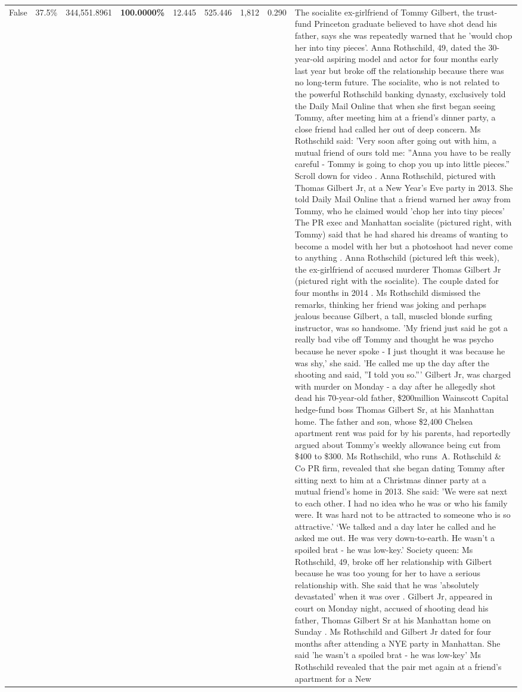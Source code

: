 \begin{table}[H]
\begin{tabular}{lllrlllll}
False & 37.5\% & 344,551.8961 & \bfseries \color{red} 100.0000\% & 12.445 & 525.446 & 1,812 & 0.290 & The socialite ex-girlfriend of Tommy Gilbert, the trust-fund Princeton graduate believed to have shot dead his father, says she was repeatedly warned that he 'would chop her into tiny pieces'. Anna Rothschild, 49, dated the 30-year-old aspiring model and actor for four months early last year but broke off the relationship because there was no long-term future. The socialite, who is not related to the powerful Rothschild banking dynasty, exclusively told the Daily Mail Online that when she first began seeing Tommy, after meeting him at a friend's dinner party, a close friend had called her out of deep concern. Ms Rothschild said: 'Very soon after going out with him, a mutual friend of ours told me: ''Anna you have to be really careful - Tommy is going to chop you up into little pieces.'' Scroll down for video . Anna Rothschild, pictured with Thomas Gilbert Jr, at a New Year's Eve party in 2013. She told Daily Mail Online that a friend warned her away from Tommy, who he claimed would 'chop her into tiny pieces' The PR exec and Manhattan socialite (pictured right, with Tommy) said that he had shared his dreams of wanting to become a model with her but a photoshoot had never come to anything . Anna Rothschild (pictured left this week), the ex-girlfriend of accused murderer Thomas Gilbert Jr (pictured right with the socialite). The couple dated for four months in 2014 . Ms Rothschild dismissed the remarks, thinking her friend was joking and perhaps jealous because Gilbert, a tall, muscled blonde surfing instructor, was so handsome. 'My friend just said he got a really bad vibe off Tommy and thought he was psycho because he never spoke - I just thought it was because he was shy,' she said. 'He called me up the day after the shooting and said, ''I told you so.''' Gilbert Jr, was charged with murder on Monday - a day after he allegedly shot dead his 70-year-old father, \$200million Wainscott Capital hedge-fund boss Thomas Gilbert Sr, at his Manhattan home. The father and son, whose \$2,400 Chelsea apartment rent was paid for by his parents, had reportedly argued about Tommy's weekly allowance being cut from \$400 to \$300. Ms Rothschild, who runs A. Rothschild \& Co PR firm, revealed that she began dating Tommy after sitting next to him at a Christmas dinner party at a mutual friend's home in 2013. She said: 'We were sat next to each other. I had no idea who he was or who his family were. It was hard not to be attracted to someone who is so attractive.' ‘We talked and a day later he called and he asked me out. He was very down-to-earth. He wasn’t a spoiled brat - he was low-key.’ Society queen: Ms Rothschild, 49, broke off her relationship with Gilbert because he was too young for her to have a serious relationship with. She said that he was 'absolutely devastated' when it was over . Gilbert Jr, appeared in court on Monday night, accused of shooting dead his father, Thomas Gilbert Sr at his Manhattan home on Sunday . Ms Rothschild and Gilbert Jr dated for four months after attending a NYE party in Manhattan. She said 'he wasn't a spoiled brat - he was low-key' Ms Rothschild revealed that the pair met again at a friend’s apartment for a New 
\end{tabular}
\end{table}
